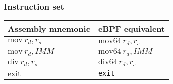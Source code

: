 \subsubsection*{Instruction set}

\begin{tabular}{|l|l|} \hline
  \textbf{Assembly mnemonic} & \textbf{eBPF equivalent}  \\ \hline
  $\mathrm{mov} ~ r_d, r_s$  & $\mathrm{mov64} ~ r_d, r_s$\\ \hline
  $\mathrm{mov} ~ r_d, IMM$  &   $\mathrm{mov64} ~ r_d, IMM$\\ \hline  
  $\mathrm{div} ~ r_d, r_s$  & $\mathrm{div64} ~ r_d, r_s $\\ \hline
  $\mathrm{exit}$ &  \texttt{exit} \\ \hline  
\end{tabular}